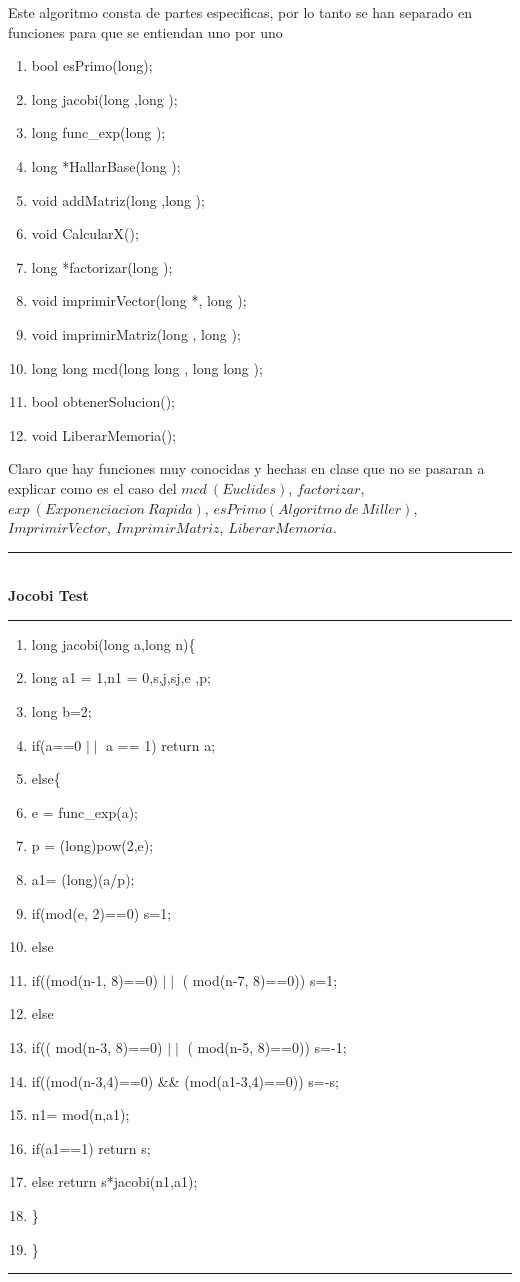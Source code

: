 \documentclass[11pt, conference]{IEEEtran}
\begin{document}
Este algoritmo consta de partes especificas, por lo tanto se han separado en funciones para que se entiendan uno por uno
\begin{enumerate}
	\item bool esPrimo(long);
	\item long jacobi(long ,long );
	\item long func\_exp(long );
	\item long *HallarBase(long );
	\item void addMatriz(long ,long );
	\item void CalcularX();
	\item long *factorizar(long );
	\item void imprimirVector(long *, long );
	\item void imprimirMatriz(long , long );
	\item long long mcd(long long  , long long  );
	\item bool obtenerSolucion();
	\item void LiberarMemoria();
\end{enumerate}
Claro que hay funciones muy conocidas y hechas en clase que no se pasaran a explicar como es el caso del $mcd\ (Euclides)$, $factorizar$, $exp\ (Exponenciacion\ Rapida)$, $esPrimo(Algoritmo\ de\ Miller)$, $ImprimirVector$, $ImprimirMatriz$, $LiberarMemoria$.\\
\rule[0mm]{181mm}{0.1mm}\\
\textbf{Jocobi Test}\\
\rule[3mm]{181mm}{0.1mm}
\begin{enumerate}
	\item long jacobi(long a,long n)\{
	\item long a1 = 1,n1 = 0,s,j,sj,e ,p;
	\item long b=2;
	\item if(a==0 $\mid\mid$ a == 1) return a;
	\item else\{
	\item \qquad e = func\_exp(a);
	\item \qquad p = (long)pow(2,e);
	\item \qquad a1= (long)(a/p);
	\item \qquad if(mod(e, 2)==0) s=1;
	\item \qquad else
	\item \qquad\qquad if((mod(n-1, 8)==0) $\mid\mid$ ( mod(n-7, 8)==0)) s=1;
	\item \qquad\qquad else
	\item \qquad\qquad\qquad if(( mod(n-3, 8)==0) $\mid\mid$ ( mod(n-5, 8)==0))  s=-1;
	\item \qquad if((mod(n-3,4)==0) \&\& (mod(a1-3,4)==0)) s=-s;
	\item \qquad n1= mod(n,a1);
	\item \qquad if(a1==1)    return s;
	\item \qquad else         return s*jacobi(n1,a1);
	\item \qquad \}
	\item \}
\end{enumerate}
\rule[3mm]{181mm}{0.1mm}\\
\end{document}
